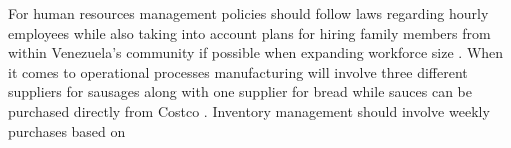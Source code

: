  For human resources management policies should follow laws regarding hourly employees while also taking into account plans for hiring family members from within Venezuela’s community if possible when expanding workforce size . When it comes to operational processes manufacturing will involve three different suppliers for sausages along with one supplier for bread while sauces can be purchased directly from Costco . Inventory management should involve weekly purchases based on